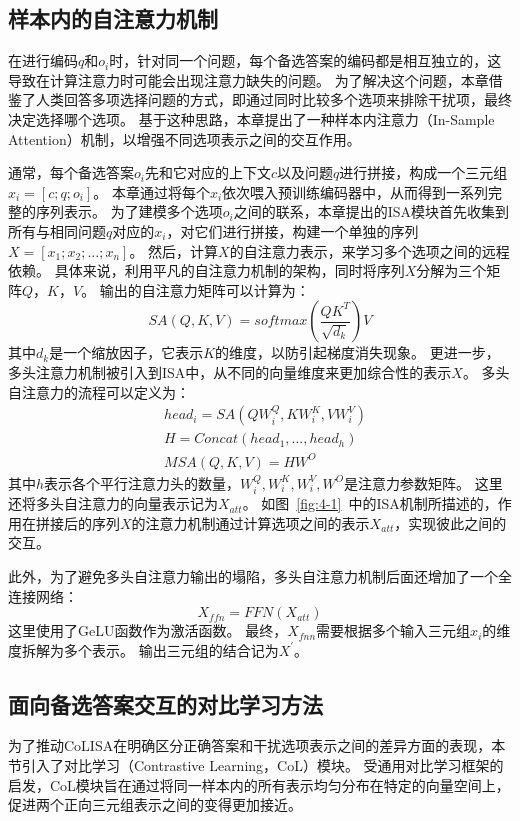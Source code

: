 

\subsection{样本内的自注意力机制}
在进行编码$q$和$o_i$时，针对同一个问题，每个备选答案的编码都是相互独立的，这导致在计算注意力时可能会出现注意力缺失的问题。
为了解决这个问题，本章借鉴了人类回答多项选择问题的方式，即通过同时比较多个选项来排除干扰项，最终决定选择哪个选项。
基于这种思路，本章提出了一种样本内注意力（In-Sample Attention）机制，以增强不同选项表示之间的交互作用。

通常，每个备选答案$o_i$先和它对应的上下文$c$以及问题$q$进行拼接，构成一个三元组$x_i=[c;q;o_i]$。
本章通过将每个$x_i$依次喂入预训练编码器中，从而得到一系列完整的序列表示。
为了建模多个选项$o_i$之间的联系，本章提出的ISA模块首先收集到所有与相同问题$q$对应的$x_i$，对它们进行拼接，构建一个单独的序列$X=[x_1;x_2;...;x_n]$。
然后，计算$X$的自注意力表示，来学习多个选项之间的远程依赖。
具体来说，利用平凡的自注意力机制的架构，同时将序列$X$分解为三个矩阵$Q$，$K$，$V$。
输出的自注意力矩阵可以计算为：
\begin{equation}
    SA(Q,K,V)=softmax(\frac {QK^T}{\sqrt{d_k}})V
\end{equation}
其中$d_k$是一个缩放因子，它表示$K$的维度，以防引起梯度消失现象\cite{vaswani2017attention}。
更进一步，多头注意力机制被引入到ISA中，从不同的向量维度来更加综合性的表示$X$。
多头自注意力的流程可以定义为：
\begin{align}
    & head_i = SA(QW^Q_i,KW^K_i,VW^V_i) \\
    & H = Concat(head_1,...,head_h) \\
    & MSA(Q,K,V) = HW^O
\end{align}
其中$h$表示各个平行注意力头的数量，$W^Q_i,W^K_i,W^V_i,W^O$是注意力参数矩阵。
这里还将多头自注意力的向量表示记为$X_{att}$。
如图~\ref{fig:4-1}~中的ISA机制所描述的，作用在拼接后的序列$X$的注意力机制通过计算选项之间的表示$X_{att}$，实现彼此之间的交互。

此外，为了避免多头自注意力输出的塌陷\cite{vaswani2017attention,sukhbaatar2019augmenting}，多头自注意力机制后面还增加了一个全连接网络：
\begin{equation}
    X_{ffn}=FFN(X_{att})
\end{equation}
这里使用了GeLU\cite{hendrycks2016gaussian}函数作为激活函数。
最终，$X_{fnn}$需要根据多个输入三元组$x_i$的维度拆解为多个表示。
输出三元组的结合记为$X^{'}$。

\subsection{面向备选答案交互的对比学习方法}
为了推动CoLISA在明确区分正确答案和干扰选项表示之间的差异方面的表现，本节引入了对比学习（Contrastive Learning，CoL）模块。
受通用对比学习框架\cite{gao2021simcse}的启发，CoL模块旨在通过将同一样本内的所有表示均匀分布在特定的向量空间上，促进两个正向三元组表示之间的变得更加接近。

